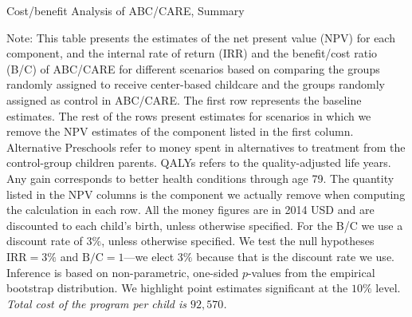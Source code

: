 \begin{table}[!htbp]
\centering
\caption{Cost/benefit Analysis of ABC/CARE, Summary}\label{table:cba}
\begin{adjustbox}{max width=\textwidth}
\begin{threeparttable}

\begin{tablenotes}
\footnotesize
\item Note: This table presents the estimates of the net present value (NPV) for each component, and the internal rate of return (IRR) and the benefit/cost ratio (B/C) of ABC/CARE for different scenarios based on comparing the groups randomly assigned to receive center-based childcare and the groups randomly assigned as control in ABC/CARE. The first row represents the baseline estimates. The rest of the rows present estimates for scenarios in which we remove the NPV estimates of the component listed in the first column. Alternative Preschools refer to money spent in alternatives to treatment from the control-group children parents. QALYs refers to the quality-adjusted life years. Any gain corresponds to better health conditions through age 79. The quantity listed in the NPV columns is the component we actually remove when computing the calculation in each row. All the money figures are in 2014 USD and are discounted to each child's birth, unless otherwise specified. For the B/C we use a discount rate of $3\%$, unless otherwise specified. We test the null hypotheses $\text{IRR} = 3\%$ and $\text{B/C} = 1$---we elect $3\%$ because that is the discount rate we use. Inference is based on non-parametric, one-sided $p$-values from the empirical bootstrap distribution. We highlight point estimates significant at the $10\%$ level.\\
\textit{Total cost of the program per child is $92,570$.}
\end{tablenotes}
\end{threeparttable}
\end{adjustbox}
\end{table}

